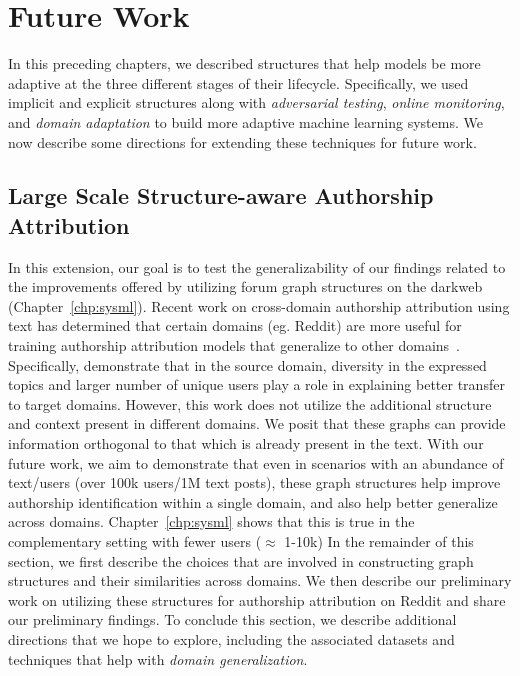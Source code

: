 \chapter{Future Work}
\label{chp:future_work}

In this preceding chapters, we described structures that help models be more adaptive at the three different stages of their lifecycle.
Specifically, we used implicit and explicit structures along with \textit{adversarial testing}, \textit{online monitoring}, and \textit{domain adaptation} to build more adaptive machine learning systems.
We now describe some directions for extending these techniques for future work.

\section{Large Scale Structure-aware Authorship Attribution}
\label{sec:future_work:scale}
In this extension, our goal is to test the generalizability of our findings related to the improvements offered by utilizing forum graph structures on the darkweb (Chapter~\ref{chp:sysml}).
Recent work on cross-domain authorship attribution using text has determined that certain domains (eg. Reddit) are more useful for training authorship attribution models that generalize to other domains~\cite{barlas2020cross,riverastao2021learning}.
Specifically, \citet{riverastao2021learning} demonstrate that in the source domain, diversity in the expressed topics and larger number of unique users play a role in explaining better transfer to target domains.
However, this work does not utilize the additional structure and context present in different domains.
We posit that these graphs can provide information orthogonal to that which is already present in the text.
 With our future work, we aim to demonstrate that even in scenarios with an abundance of text/users (over 100k users/1M text posts), these graph structures help improve authorship identification within a single domain, and also help better generalize across domains.
 Chapter~\ref{chp:sysml} shows that this is true in the complementary setting with fewer users ($\approx$ 1-10k)
In the remainder of this section, we first describe the choices that are involved in constructing graph structures and their similarities across domains. 
We then describe our preliminary work on utilizing these structures for authorship attribution on Reddit and share our preliminary findings.
To conclude this section, we describe additional directions that we hope to explore, including the associated datasets and techniques that help with \textit{domain generalization}.

